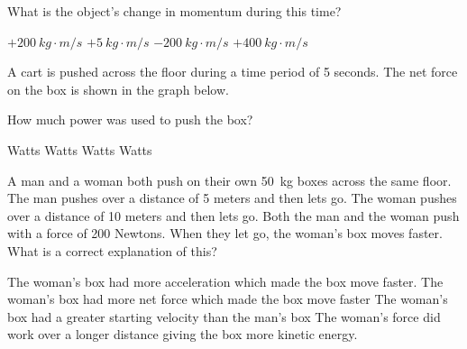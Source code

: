 \documentclass[answers]{exam}
\begin{document}
\begin{questions}
What is the object's change in momentum during this time?

\begin{randomizeoneparchoices}[norandomize]
    \choice $+\SI{200}{kg\cdot m/s}$
    \choice $+\SI{5}{kg\cdot m/s}$
    \choice $-\SI{200}{kg\cdot m/s}$
    \correctchoice $+\SI{400}{kg\cdot m/s}$
\end{randomizeoneparchoices}


\question
A cart is pushed across the floor during a time period of 5 seconds.  The net force on the box is shown in the graph below.

\begin{center}
\end{center}

How much power was used to push the box?

\begin{randomizeoneparchoices}[norandomize]
     Watts
     Watts
     Watts
     Watts
\end{randomizeoneparchoices}



\question
A man and a woman both push on their own \SI{50}{kg} boxes across the same floor. The man pushes over a distance of 5 meters and then lets go. The woman pushes over a distance of 10 meters and then lets go.  Both the man and the woman push with a force of 200 Newtons. When they let go, the woman's box moves faster. What is a correct explanation of this?

\begin{randomizechoices}[norandomize]
    \choice The woman's box had more acceleration which made the box move faster.
    \choice The woman's box had more net force which made the box move faster
    \choice The woman's box had a greater starting velocity than the man's box
    \correctchoice The woman's force did work over a longer distance giving the box more kinetic energy.
\end{randomizechoices}


\end{questions}
\end{document}
